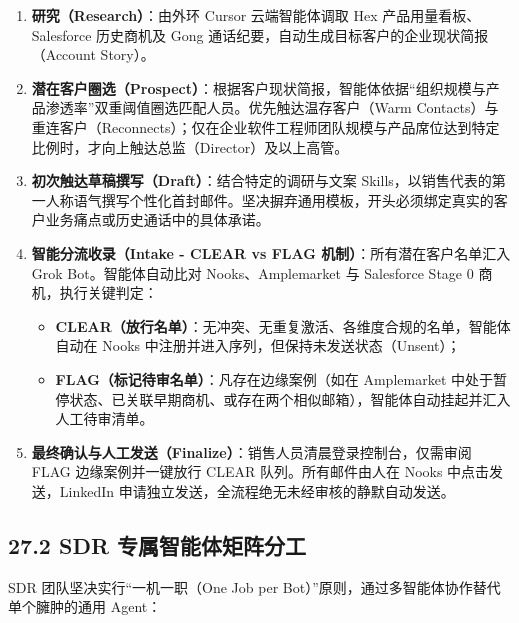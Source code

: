\documentclass[10.5pt,a4paper,oneside]{report}
\providecommand{\tightlist}{\setlength{\itemsep}{0pt}\setlength{\parskip}{0pt}}
\begin{document}
\begin{enumerate}
\def\labelenumi{\arabic{enumi}.}
\tightlist
\item
  \textbf{研究（Research）}：由外环 Cursor 云端智能体调取 Hex
  产品用量看板、Salesforce 历史商机及 Gong
  通话纪要，自动生成目标客户的企业现状简报（Account Story）。
\item
  \textbf{潜在客户圈选（Prospect）}：根据客户现状简报，智能体依据``组织规模与产品渗透率''双重阈值圈选匹配人员。优先触达温存客户（Warm
  Contacts）与重连客户（Reconnects）；仅在企业软件工程师团队规模与产品席位达到特定比例时，才向上触达总监（Director）及以上高管。
\item
  \textbf{初次触达草稿撰写（Draft）}：结合特定的调研与文案
  Skills，以销售代表的第一人称语气撰写个性化首封邮件。坚决摒弃通用模板，开头必须绑定真实的客户业务痛点或历史通话中的具体承诺。
\item
  \textbf{智能分流收录（Intake - CLEAR vs FLAG
  机制）}：所有潜在客户名单汇入 Grok Bot。智能体自动比对
  Nooks、Amplemarket 与 Salesforce Stage 0 商机，执行关键判定：

  \begin{itemize}
  \tightlist
  \item
    \textbf{CLEAR（放行名单）}：无冲突、无重复激活、各维度合规的名单，智能体自动在
    Nooks 中注册并进入序列，但保持未发送状态（Unsent）；
  \item
    \textbf{FLAG（标记待审名单）}：凡存在边缘案例（如在 Amplemarket
    中处于暂停状态、已关联早期商机、或存在两个相似邮箱），智能体自动挂起并汇入人工待审清单。
  \end{itemize}
\item
  \textbf{最终确认与人工发送（Finalize）}：销售人员清晨登录控制台，仅需审阅
  FLAG 边缘案例并一键放行 CLEAR 队列。所有邮件由人在 Nooks
  中点击发送，LinkedIn 申请独立发送，全流程绝无未经审核的静默自动发送。
\end{enumerate}

\subsection{27.2 SDR
专属智能体矩阵分工}\label{sdr-ux4e13ux5c5eux667aux80fdux4f53ux77e9ux9635ux5206ux5de5}

SDR 团队坚决实行``一机一职（One Job per
Bot）''原则，通过多智能体协作替代单个臃肿的通用 Agent：
\end{document}
